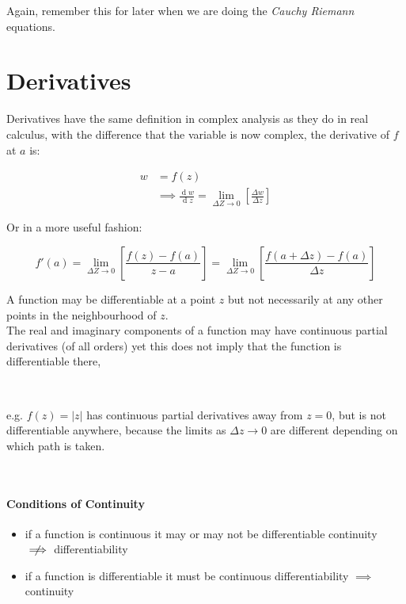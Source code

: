 \documentclass[class=article, crop=false]{standalone}
\begin{document}
Again, remember this for later when we are doing the \textit{Cauchy Riemann} equations.


\newpage


\section{Derivatives}
Derivatives have the same definition in complex analysis as they do in real calculus, with the difference that the variable is now complex, the derivative of $f$ at $a$ is:

  \begin{align*}
    w &= f \left( z \right)\\
    &\implies \frac{\operatorname{d} w}{\operatorname{d} z} = \lim_{\Delta Z\rightarrow 0}\left[ \frac{\Delta w}{\Delta z} \right] 
  \end{align*}

Or in a more useful fashion:

\[
  f'\left( a \right) = \lim_{\Delta Z\rightarrow 0}\left[ \frac{f \left( z \right) - f \left( a \right) }{z - a} \right] = \lim_{\Delta Z\rightarrow 0}\left[ \frac{f \left( a + \Delta z \right) -  f \left( a \right) }{\Delta z} \right] 
\]

A function may be differentiable at a point $z$ but not necessarily at any other points in the neighbourhood of $z$. \\

The real and imaginary components of a function may have continuous partial derivatives (of all orders) yet this does not imply that the function is differentiable there, 

\ \

\hfill\begin{minipage}{\dimexpr\textwidth-3cm}
e.g.  $   f\left( z \right) =   \left| z \right|$ has continuous partial derivatives away from $z =  0$, but is not differentiable anywhere, because the limits as $\Delta   z  \rightarrow 0$ are different depending on which path is taken.\end{minipage}
\ \





\paragraph{Conditions of Continuity}
\begin{itemize}
  \item if a function is continuous it may or may not be differentiable
  \subitem continuity $ \centernot\implies $ differentiability
  \item if a function is differentiable it must be continuous
  \subitem differentiability $ \implies  $ continuity
\end{itemize}
\end{document}
